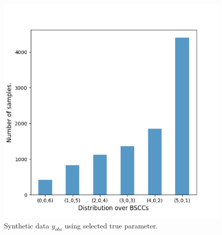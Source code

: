 \begin{figure}[!htb]
    \centering
    \includegraphics[width=0.45\linewidth]{figures/sir510_data.png}
    \caption{Synthetic data $y_{obs}$ using selected true parameter.}
\end{figure}
